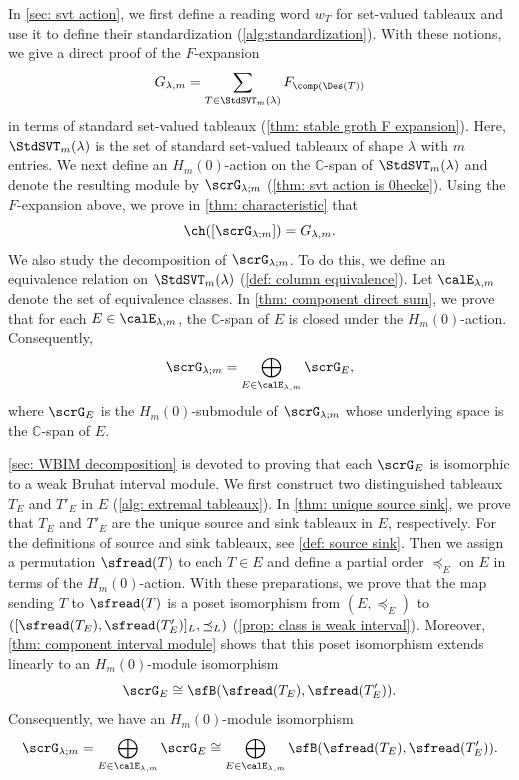 \documentclass[12pt, reqno]{amsart}
\numberwithin{equation}{section}
\numberwithin{figure}{section}
\numberwithin{table}{section}
\theoremstyle{definition}
\def\C{\mathbb C}
\begin{document}
In \cref{sec: svt action}, we first define a reading word $w_T$ for set-valued tableaux and use it to define their standardization (\cref{alg:standardization}).
With these notions, we give a direct proof of the $F$-expansion
\[
G_{\lambda,m}
=\sum_{T\in\StdSVT_m(\lambda)}F_{\comp(\Des(T))}
\]
in terms of standard set-valued tableaux (\cref{thm: stable groth F expansion}).
Here, $\StdSVT_m(\lambda)$ is the set of standard set-valued tableaux of shape $\lambda$ with $m$ entries.
We next define an $H_m(0)$-action on the $\C$-span of $\StdSVT_m(\lambda)$ and denote the resulting module by $\scrG_{\lambda;m}$ (\cref{thm: svt action is 0hecke}).
Using the $F$-expansion above, we prove in \cref{thm: characteristic} that 
\[
\ch([\scrG_{\lambda;m}])=G_{\lambda,m}.
\]
We also study the decomposition of $\scrG_{\lambda;m}$.
To do this, we define an equivalence relation on $\StdSVT_m(\lambda)$ (\cref{def: column equivalence}).
Let $\calE_{\lambda,m}$ denote the set of equivalence classes.
In \cref{thm: component direct sum}, we prove that for each $E \in \calE_{\lambda,m}$, the $\C$-span of $E$ is closed under the $H_m(0)$-action.
Consequently,
\[
\scrG_{\lambda;m} = \bigoplus_{E\in\calE_{\lambda,m}}\scrG_E,
\]
where $\scrG_E$ is the $H_m(0)$-submodule of $\scrG_{\lambda;m}$ whose underlying space is the $\C$-span of $E$.


\cref{sec: WBIM decomposition} is devoted to proving that each $\scrG_E$ is isomorphic to a weak Bruhat interval module.
We first construct two distinguished tableaux $T_E$ and $T'_E$ in $E$ (\cref{alg: extremal tableaux}).
In \cref{thm: unique source sink}, we prove that $T_E$ and $T'_E$ are the unique source and sink tableaux in $E$, respectively.
For the definitions of source and sink tableaux, see \cref{def: source sink}.
Then we assign a permutation $\sfread(T)$ to each $T \in E$ and define a partial order $\preceq_E$ on $E$ in terms of the $H_m(0)$-action.
With these preparations, we prove that the map sending $T$ to $\sfread(T)$ is a poset isomorphism from $(E,\preceq_E)$ to $([\sfread(T_E),\sfread(T'_E)]_L,\preceq_L)$ (\cref{prop: class is weak interval}).
Moreover, \cref{thm: component interval module} shows that this poset isomorphism extends linearly to an $H_m(0)$-module isomorphism
\[
\scrG_E\cong\sfB(\sfread(T_E),\sfread(T'_E)).
\]
Consequently, we have an $H_m(0)$-module isomorphism
\[
\scrG_{\lambda;m}
=\bigoplus_{E\in\calE_{\lambda,m}}\scrG_E
\cong
\bigoplus_{E\in\calE_{\lambda,m}}
\sfB(\sfread(T_E),\sfread(T'_E)).
\]
\end{document}
